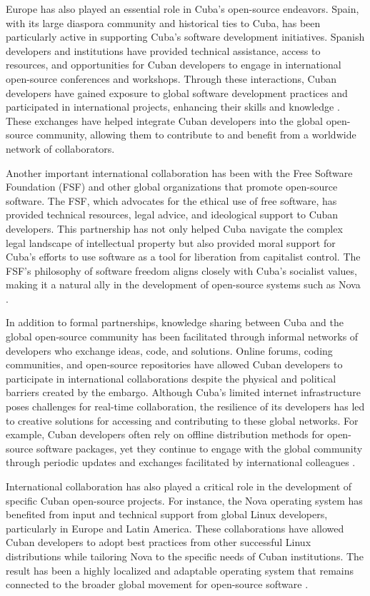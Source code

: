 \begin{refsection}
Europe has also played an essential role in Cuba’s open-source endeavors. Spain, with its large diaspora community and historical ties to Cuba, has been particularly active in supporting Cuba’s software development initiatives. Spanish developers and institutions have provided technical assistance, access to resources, and opportunities for Cuban developers to engage in international open-source conferences and workshops. Through these interactions, Cuban developers have gained exposure to global software development practices and participated in international projects, enhancing their skills and knowledge \cite[pp.~123-145]{perez}. These exchanges have helped integrate Cuban developers into the global open-source community, allowing them to contribute to and benefit from a worldwide network of collaborators.

Another important international collaboration has been with the Free Software Foundation (FSF) and other global organizations that promote open-source software. The FSF, which advocates for the ethical use of free software, has provided technical resources, legal advice, and ideological support to Cuban developers. This partnership has not only helped Cuba navigate the complex legal landscape of intellectual property but also provided moral support for Cuba’s efforts to use software as a tool for liberation from capitalist control. The FSF’s philosophy of software freedom aligns closely with Cuba’s socialist values, making it a natural ally in the development of open-source systems such as Nova \cite[pp.~67-89]{kapcia}.

In addition to formal partnerships, knowledge sharing between Cuba and the global open-source community has been facilitated through informal networks of developers who exchange ideas, code, and solutions. Online forums, coding communities, and open-source repositories have allowed Cuban developers to participate in international collaborations despite the physical and political barriers created by the embargo. Although Cuba’s limited internet infrastructure poses challenges for real-time collaboration, the resilience of its developers has led to creative solutions for accessing and contributing to these global networks. For example, Cuban developers often rely on offline distribution methods for open-source software packages, yet they continue to engage with the global community through periodic updates and exchanges facilitated by international colleagues \cite[pp.~112-134]{kapcia}.

International collaboration has also played a critical role in the development of specific Cuban open-source projects. For instance, the Nova operating system has benefited from input and technical support from global Linux developers, particularly in Europe and Latin America. These collaborations have allowed Cuban developers to adopt best practices from other successful Linux distributions while tailoring Nova to the specific needs of Cuban institutions. The result has been a highly localized and adaptable operating system that remains connected to the broader global movement for open-source software \cite[pp.~134-157]{feinberg}.


\end{refsection}
